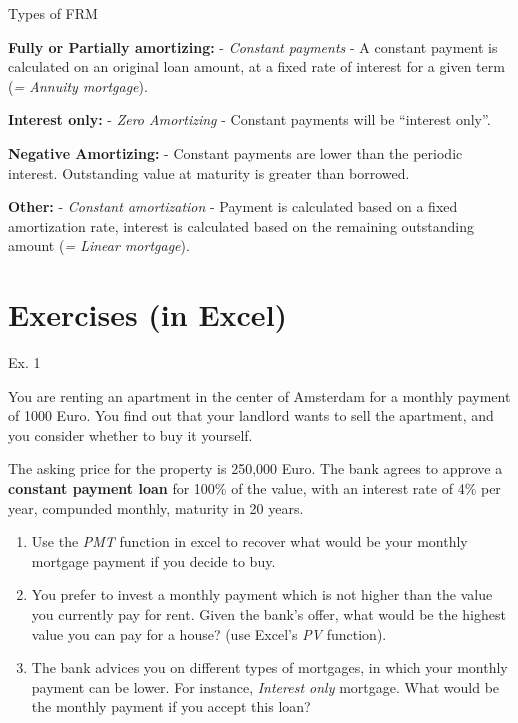 \documentclass[ignorenonframetext,]{beamer}
\providecommand{\tightlist}{%
\setlength{\itemsep}{0pt}\setlength{\parskip}{0pt}}
\begin{document}
\begin{frame}{Types of FRM}

\textbf{Fully or Partially amortizing:} - \emph{Constant payments} - A
constant payment is calculated on an original loan amount, at a fixed
rate of interest for a given term (\emph{= Annuity mortgage}).

\textbf{Interest only:} - \emph{Zero Amortizing} - Constant payments
will be ``interest only''.

\textbf{Negative Amortizing:} - Constant payments are lower than the
periodic interest. Outstanding value at maturity is greater than
borrowed.

\textbf{Other:} - \emph{Constant amortization} - Payment is calculated
based on a fixed amortization rate, interest is calculated based on the
remaining outstanding amount (\emph{= Linear mortgage}).

\end{frame}

\section{Exercises (in Excel)}\label{exercises-in-excel}

\begin{frame}{Ex. 1}

\small

You are renting an apartment in the center of Amsterdam for a monthly
payment of 1000 Euro. You find out that your landlord wants to sell the
apartment, and you consider whether to buy it yourself.

The asking price for the property is 250,000 Euro. The bank agrees to
approve a \textbf{constant payment loan} for 100\% of the value, with an
interest rate of 4\% per year, compunded monthly, maturity in 20 years.

\begin{enumerate}
\def\labelenumi{\arabic{enumi}.}
\tightlist
\item
  Use the \emph{PMT} function in excel to recover what would be your
  monthly mortgage payment if you decide to buy.
\item
  You prefer to invest a monthly payment which is not higher than the
  value you currently pay for rent. Given the bank's offer, what would
  be the highest value you can pay for a house? (use Excel's \emph{PV}
  function).
\item
  The bank advices you on different types of mortgages, in which your
  monthly payment can be lower. For instance, \emph{Interest only}
  mortgage. What would be the monthly payment if you accept this loan?
\end{enumerate}

\normalsize

\end{frame}
\end{document}
